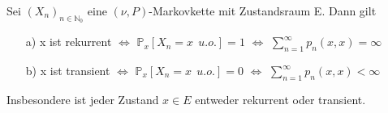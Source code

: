 \label{alternative Chrakterisierung von rekurrent/transient}
Sei $(X_{n})_{n \in \mathbb{N}_{0}}$ eine $(\nu,P)$-Markovkette mit Zustandsraum E. Dann gilt
\begin{itemize}
\item[a)] x ist rekurrent $\Leftrightarrow$ $\mathbb{P}_{x}[X_{n} = x \: \: u.o.] = 1$ $\Leftrightarrow$ $\sum_{n=1}^{\infty} p_{n}(x,x) = \infty$
\item[b)] x ist transient $\Leftrightarrow$ $\mathbb{P}_{x}[X_{n} = x \: \: u.o.] = 0$ $\Leftrightarrow$ $\sum_{n=1}^{\infty} p_{n}(x,x) < \infty$
\end{itemize}
Insbesondere ist jeder Zustand $x \in E$ entweder rekurrent oder transient.